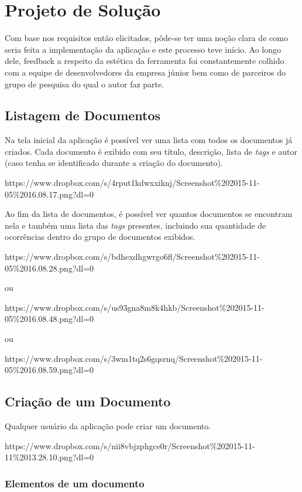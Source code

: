 \chapter{Projeto de Solução}

Com base nos requisitos então elicitados, pôde-se ter uma noção clara de como seria feita a implementação da aplicação e este processo teve início. Ao longo dele, feedback a respeito da estética da ferramenta foi constantemente colhido com a equipe de desenvolvedores da empresa júnior bem como de parceiros do grupo de pesquisa do qual o autor faz parte.

\section{Listagem de Documentos}

Na tela inicial da aplicação é possível ver uma lista com todos os documentos já criados. Cada documento é exibido com seu título, descrição, lista de \textit{tags} e autor (caso tenha se identificado durante a criação do documento).

https://www.dropbox.com/s/4rput1kdwxxiknj/Screenshot\%202015-11-05\%2016.08.17.png?dl=0

Ao fim da lista de documentos, é possível ver quantos documentos se encontram nela e também uma lista das \textit{tags} presentes, incluindo sua quantidade de ocorrências dentro do grupo de documentos exibidos.

https://www.dropbox.com/s/bdhexdhgwrgo6fl/Screenshot\%202015-11-05\%2016.08.28.png?dl=0

ou

https://www.dropbox.com/s/us93gna8m8k4hkb/Screenshot\%202015-11-05\%2016.08.48.png?dl=0

ou

https://www.dropbox.com/s/3wm1tq2s6gqsrnq/Screenshot\%202015-11-05\%2016.08.59.png?dl=0

\section{Criação de um Documento}

Qualquer usuário da aplicação pode criar um documento.

https://www.dropbox.com/s/nii8vbjzphgce0r/Screenshot\%202015-11-11\%2013.28.10.png?dl=0

\subsection{Elementos de um documento}

